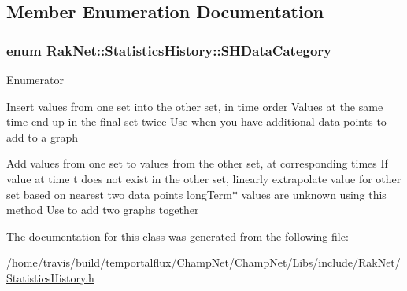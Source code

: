 \subsection{Member Enumeration Documentation}
\hypertarget{class_rak_net_1_1_statistics_history_a197b0da149b5168c77891e3f9d289a0b}{
\subsubsection[{S\-H\-Data\-Category}]{\setlength{\rightskip}{0pt plus 5cm}enum {\bf Rak\-Net\-::\-Statistics\-History\-::\-S\-H\-Data\-Category}}}\label{class_rak_net_1_1_statistics_history_a197b0da149b5168c77891e3f9d289a0b}
\begin{Desc}
\item[Enumerator]\par
\begin{description}
\item[{\em 
\hypertarget{class_rak_net_1_1_statistics_history_a197b0da149b5168c77891e3f9d289a0ba98c350223aab0b252a92a03a4657b251}{D\-C\-\_\-\-D\-I\-S\-C\-R\-E\-T\-E}\label{class_rak_net_1_1_statistics_history_a197b0da149b5168c77891e3f9d289a0ba98c350223aab0b252a92a03a4657b251}
}]Insert values from one set into the other set, in time order Values at the same time end up in the final set twice Use when you have additional data points to add to a graph \item[{\em 
\hypertarget{class_rak_net_1_1_statistics_history_a197b0da149b5168c77891e3f9d289a0ba2540de6b5166cf35499dbfeb15b96d98}{D\-C\-\_\-\-C\-O\-N\-T\-I\-N\-U\-O\-U\-S}\label{class_rak_net_1_1_statistics_history_a197b0da149b5168c77891e3f9d289a0ba2540de6b5166cf35499dbfeb15b96d98}
}]Add values from one set to values from the other set, at corresponding times If value at time t does not exist in the other set, linearly extrapolate value for other set based on nearest two data points long\-Term$\ast$ values are unknown using this method Use to add two graphs together \end{description}
\end{Desc}


The documentation for this class was generated from the following file\-:\begin{DoxyCompactItemize}
\item 
/home/travis/build/temportalflux/\-Champ\-Net/\-Champ\-Net/\-Libs/include/\-Rak\-Net/\hyperlink{_statistics_history_8h}{Statistics\-History.\-h}\end{DoxyCompactItemize}
